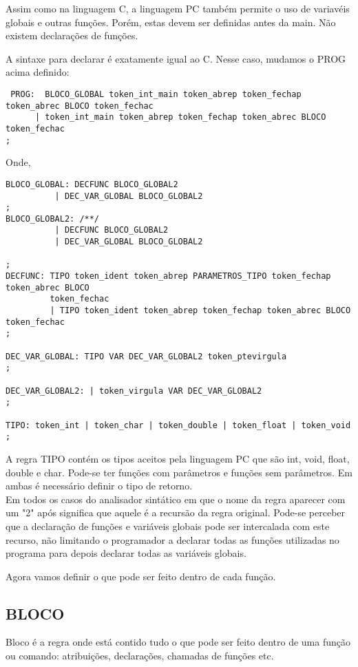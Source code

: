 \documentclass[a4paper,10pt]{article}
\begin{document}
Assim como na linguagem C, a linguagem PC também permite o uso de variavéis globais e outras funções. Porém, estas devem ser definidas
antes da main. Não existem declarações de funções.

A sintaxe para declarar é exatamente igual ao C. Nesse caso, mudamos o PROG acima definido:

\begin{verbatim}
 PROG:	BLOCO_GLOBAL token_int_main token_abrep token_fechap token_abrec BLOCO token_fechac
      | token_int_main token_abrep token_fechap token_abrec BLOCO token_fechac
;
\end{verbatim}
Onde,
\begin{verbatim}
BLOCO_GLOBAL: DECFUNC BLOCO_GLOBAL2
	      | DEC_VAR_GLOBAL BLOCO_GLOBAL2
;
BLOCO_GLOBAL2: /**/
	      | DECFUNC BLOCO_GLOBAL2
	      | DEC_VAR_GLOBAL BLOCO_GLOBAL2
		
;
DECFUNC: TIPO token_ident token_abrep PARAMETROS_TIPO token_fechap token_abrec BLOCO 
         token_fechac
         | TIPO token_ident token_abrep token_fechap token_abrec BLOCO token_fechac
;

DEC_VAR_GLOBAL: TIPO VAR DEC_VAR_GLOBAL2 token_ptevirgula
;

DEC_VAR_GLOBAL2: | token_virgula VAR DEC_VAR_GLOBAL2
;

TIPO: token_int | token_char | token_double | token_float | token_void
;
\end{verbatim}

A regra TIPO contém os tipos aceitos pela linguagem PC que são int, void, float, double e char. Pode-se ter funções com parâmetros e funções sem parâmetros.
Em ambas é necessário definir o tipo de retorno.\\

Em todos os casos do analisador sintático em que o nome da regra aparecer com um "2" após significa que aquele é a recursão da regra original.
Pode-se perceber que a declaração de funções e variáveis globais pode ser intercalada com este recurso, não limitando o programador
a declarar todas as funções utilizadas no programa para depois declarar todas as variáveis globais.

Agora vamos definir o que pode ser feito dentro de cada função.
\subsection{BLOCO}
Bloco é a regra onde está contido tudo o que pode ser feito dentro de uma função ou comando: atribuições, declarações, chamadas de funções etc.
\end{document}
